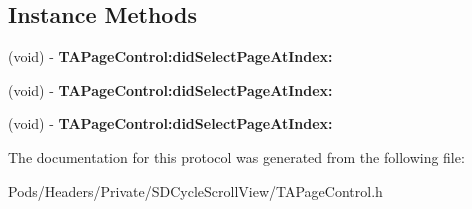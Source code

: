 \subsection*{Instance Methods}
\begin{DoxyCompactItemize}
\item 
\mbox{\label{protocol_t_a_page_control_delegate_01-p_a00084aefb0a67df9973f51ee3281dc79}} 
(void) -\/ {\bfseries T\+A\+Page\+Control\+:did\+Select\+Page\+At\+Index\+:}
\item 
\mbox{\label{protocol_t_a_page_control_delegate_01-p_a00084aefb0a67df9973f51ee3281dc79}} 
(void) -\/ {\bfseries T\+A\+Page\+Control\+:did\+Select\+Page\+At\+Index\+:}
\item 
\mbox{\label{protocol_t_a_page_control_delegate_01-p_a00084aefb0a67df9973f51ee3281dc79}} 
(void) -\/ {\bfseries T\+A\+Page\+Control\+:did\+Select\+Page\+At\+Index\+:}
\end{DoxyCompactItemize}


The documentation for this protocol was generated from the following file\+:\begin{DoxyCompactItemize}
\item 
Pods/\+Headers/\+Private/\+S\+D\+Cycle\+Scroll\+View/T\+A\+Page\+Control.\+h\end{DoxyCompactItemize}
